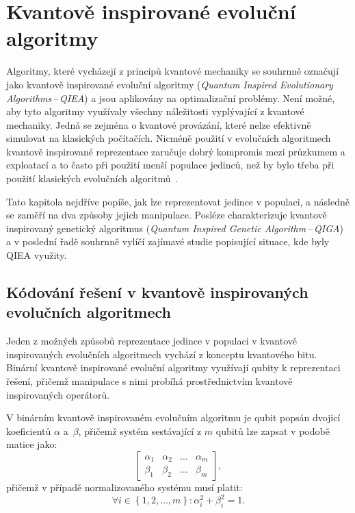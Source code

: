 \chapter{Kvantově inspirované evoluční algoritmy} \label{chapt:qiea}
Algoritmy, které vycházejí z principů kvantové mechaniky se souhrnně označují jako kvantově inspirované evoluční algoritmy (\emph{Quantum Inspired Evolutionary Algorithms\,--\,QIEA}) a jsou aplikovány na optimalizační problémy. 
Není možné, aby tyto algoritmy využívaly všechny náležitosti vyplývající z kvantové mechaniky. 
Jedná se zejména o kvantové provázání, které nelze efektivně simulovat na klasických počítačích. 
Nicméně použití v evolučních algoritmech kvantově inspirované reprezentace zaručuje dobrý kompromis mezi průzkumem a exploatací a to často při použití menší populace jedinců, než by bylo třeba při použití klasických evolučních algoritmů~\cite{NaturalComputing}.

Tato kapitola nejdříve popíše, jak lze reprezentovat jedince v populaci, a následně se zaměří na dva způsoby jejich manipulace. 
Posléze charakterizuje kvantově inspirovaný genetický algoritmus (\emph{Quantum Inspired Genetic Algorithm\,--\,QIGA}) a v poslední řadě souhrnně vylíčí zajímavé studie popisující situace, kde byly QIEA využity. 

\section{Kódování řešení v kvantově inspirovaných evolučních algoritmech}
Jeden z možných způsobů reprezentace jedince v populaci v kvantově inspirovaných evolučních algoritmech vychází z konceptu kvantového bitu. 
Binární kvantově inspirované evoluční algoritmy využívají qubity k reprezentaci řešení, přičemž manipulace s nimi probíhá prostřednictvím kvantově inspirovaných operátorů.

V binárním kvantově inspirovaném evolučním algoritmu je qubit popsán dvojicí koeficientů $\alpha$ a~$\beta$, přičemž systém sestávající z $m$ qubitů lze zapsat v podobě matice jako: 
\begin{equation}\label{eq:quantum-representation}
    \begin{bmatrix}
        \alpha_1 & \alpha_2 & \dots & \alpha_m \\
        \beta_1  & \beta_2  & \dots & \beta_m
    \end{bmatrix},
\end{equation}
přičemž v případě normalizovaného systému musí platit:
\begin{equation}\label{eq:normalized-quantum-representation}
    \forall i \in \left\{1,2,\dots,m \right\}: \alpha^2_i + \beta^2_i = 1.
\end{equation}

